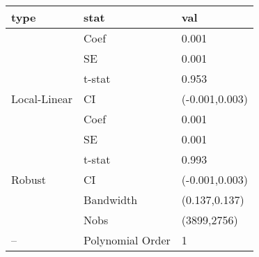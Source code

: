 
\begin{tabular}{lll}
\toprule
type & stat & val\\
\midrule
 & Coef & 0.001\\

 & SE & 0.001\\

 & t-stat & 0.953\\

\multirow{-4}{*}{\raggedright\arraybackslash Local-Linear} & CI & (-0.001,0.003)\\
\cmidrule{1-3}
 & Coef & 0.001\\

 & SE & 0.001\\

 & t-stat & 0.993\\

\multirow{-4}{*}{\raggedright\arraybackslash Robust} & CI & (-0.001,0.003)\\
\cmidrule{1-3}
 & Bandwidth & (0.137,0.137)\\

 & Nobs & (3899,2756)\\

\multirow{-3}{*}{\raggedright\arraybackslash --} & Polynomial Order & 1\\
\bottomrule
\end{tabular}